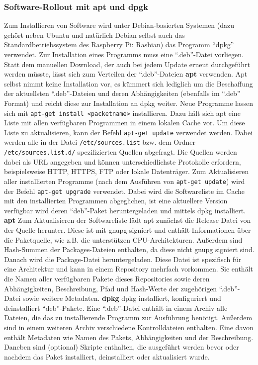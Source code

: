 \subsubsection{Software-Rollout mit apt und dpgk}
Zum Installieren von Software wird unter Debian-basierten Systemen (dazu gehört neben Ubuntu und natürlich Debian selbst auch das Standardbetriebssystem des Raspberry Pi: Rasbian) das Programm \enquote{dpkg} verwendet.
Zur Installation eines Programms muss eine \enquote{.deb}-Datei vorliegen. Statt dem manuellen Download, der auch bei jedem Update erneut durchgeführt werden müsste, lässt sich zum Verteilen der \enquote{.deb}-Dateien \textbf{apt} verwenden.
Apt selbst nimmt keine Installation vor, es kümmert sich lediglich um die Beschaffung der aktuellsten \enquote{.deb}-Dateien und deren Abhängigkeiten (ebenfalls im \enquote{.deb} Format) und reicht diese zur Installation an dpkg weiter.
Neue Programme lassen sich mit \texttt{apt-get install <packetname>} installieren.
Dazu hält sich apt eine Liste mit allen verfügbaren Programmen in einem lokalen Cache vor. Um diese Liste zu aktualisieren, kann der Befehl \texttt{apt-get update} verwendet werden.
Dabei werden alle in der Datei \texttt{/etc/sources.list} bzw. dem Ordner \texttt{/etc/sources.list.d/} spezifizierten Quellen abgefragt.
Die Quellen werden dabei als URL angegeben und können unterschiedlichste Protokolle erfordern,
beispielsweise HTTP, HTTPS, FTP oder lokale Datenträger.
Zum Aktualisieren aller installierten Programme (nach dem Ausführen von \texttt{apt-get update}) wird der Befehl \texttt{apt-get upgrade} verwendet. Dabei wird die Softwareliste im Cache mit den installierten Programmen abgeglichen, ist eine aktuellere Version verfügbar wird deren \enquote{deb}-Paket heruntergeladen und mittels dpkg installiert.
\newline\textbf{apt}\newline
Zum Aktualisieren der Softwareliste lädt apt zunächst die Release Datei von der Quelle herunter. Diese ist mit gnupg signiert und enthält Informationen über die Paketquelle, wie z.B. die unterstützen CPU-Architekturen.
Außerdem sind Hash-Summen der Packages-Dateien enthalten, da diese nicht gnupg signiert sind.
Danach wird die Package-Datei heruntergeladen. Diese Datei ist spezifisch für eine Architektur und kann in einem Repository mehrfach vorkommen.
Sie enthält die Namen aller verfügbaren Pakete dieses Repositories sowie deren Abhängigkeiten, Beschreibung, Pfad und Hash-Werte der zugehörigen \enquote{.deb}-Datei sowie weitere Metadaten.
\newline\textbf{dpkg}\newline
dpkg installiert, konfiguriert und deinstalliert \enquote{deb}-Pakete.
Eine \enquote{.deb}-Datei enthält in einem Archiv alle Dateien, die das zu installierende Programm zur Ausführung benötigt.
Außerdem sind in einem weiteren Archiv verschiedene Kontrolldateien enthalten. Eine davon enthält Metadaten wie Namen des Pakets, Abhängigkeiten und der Beschreibung.
Daneben sind (optional) Skripte enthalten, die ausgeführt werden bevor oder nachdem das Paket installiert, deinstalliert oder aktualisiert wurde. 

